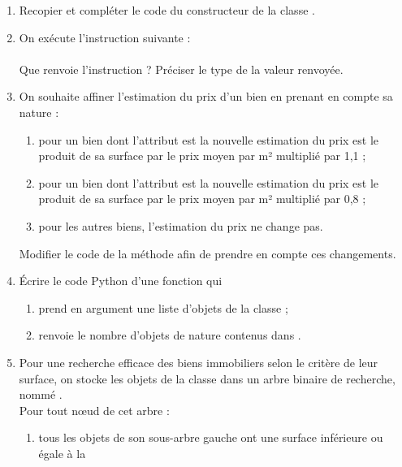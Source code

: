 \documentclass[a4paper,12pt,french]{book}
\begin{document}
    \begin{enumerate}[\bfseries 1.]
        \item 	Recopier et compléter le code du constructeur de la classe .
        \item 	On exécute l'instruction suivante :\\
                \\
                Que renvoie l'instruction  ? Préciser le type de la valeur renvoyée.
        \item On souhaite affiner l’estimation du prix d’un bien en prenant en compte sa nature :
        \begin{enumerate}[--]
            \item	pour un bien dont l’attribut  est  la nouvelle estimation du prix est le
            produit de sa surface par le prix moyen par m² multiplié par 1,1 ;
            \item 	pour un bien dont l’attribut  est  la nouvelle estimation du prix est le
            produit de sa surface par le prix moyen par m² multiplié par 0,8 ;
            \item pour les autres biens, l'estimation du prix ne change pas.
        \end{enumerate}
        Modifier le code de la méthode  afin de prendre en compte ces changements.
\newpage
        \item Écrire le code Python d'une fonction  qui
        \begin{enumerate}[--]
            \item	prend en argument une liste  d'objets de la classe  ;
            \item 	renvoie le nombre d’objets de nature  contenus dans .
        \end{enumerate}
        \item  Pour une recherche efficace des biens immobiliers selon le critère de leur surface, on
        stocke les objets de la classe  dans un arbre binaire de recherche, nommé .\\
        Pour tout nœud de cet arbre :
        \begin{enumerate}[--]
            \item 	tous les objets de son sous-arbre gauche ont une surface inférieure ou égale à la

\end{enumerate}
\end{enumerate}
\end{document}
